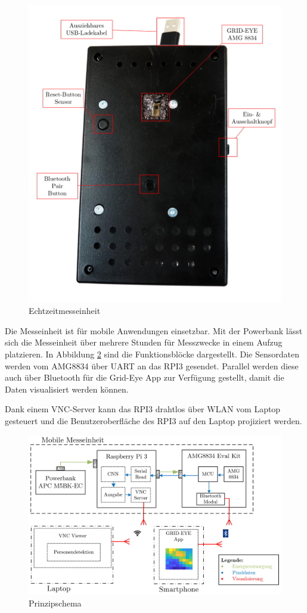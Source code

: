\begin{figure}[H]
	\centering
	\includegraphics[width=0.85\linewidth]{fig/Echtzeitmessgeraet.jpg}
	\caption[Echtzeitmesseinheit]{Echtzeitmesseinheit}
	\label{fig:einheit1}
\end{figure}

Die Messeinheit ist für mobile Anwendungen einsetzbar. Mit der Powerbank lässt sich die Messeinheit über mehrere Stunden für Messzwecke in einem Aufzug platzieren. In Abbildung \ref{fig:einheit2}  sind die Funktionsblöcke dargestellt. Die Sensordaten werden vom AMG8834 über \ac{UART} an das \ac{RPI3} gesendet. Parallel werden diese auch über Bluetooth für die Grid-Eye App zur Verfügung gestellt, damit die Daten visualisiert werden können.

Dank einem \ac{VNC}-Server kann das \ac{RPI3} drahtlos über WLAN vom Laptop gesteuert und die Benutzeroberfläche des \ac{RPI3} auf den Laptop projiziert werden. 

\begin{figure}[H]
	\centering
	\includegraphics[width=0.9\linewidth]{fig/Messeinheit.png}
	\caption{Prinzipschema}
	\label{fig:einheit2}
\end{figure}


